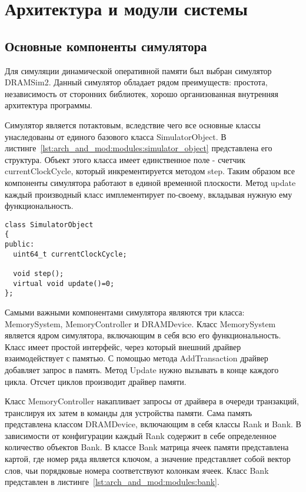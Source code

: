 \section{Архитектура и модули системы} %
\label{sec:arch_and_mod}

\subsection{Основные компоненты симулятора}
\label{sub:arch_and_mod:modules}
Для симуляции динамической оперативной памяти был выбран симулятор DRAMSim2. Данный симулятор обладает рядом преимуществ: простота, независимость от сторонних библиотек, хорошо организованная внутренняя архитектура программы. 

Симулятор является потактовым, вследствие чего все основные классы унаследованы от единого базового класса SimulatorObject. В листинге~\ref{lst:arch_and_mod:modules:simulator_object} представлена его структура. Объект этого класса имеет единственное поле - счетчик currentClockCycle, который инкрементируется методом step. Таким образом все компоненты симулятора работают в единой временной плоскости. Метод update каждый производный класс имплементирует по-своему, вкладывая нужную ему функциональность.  

\begin{lstlisting}[style=cplusplusstyle, caption={Класс SimulatorObject}, label=lst:arch_and_mod:modules:simulator_object]
class SimulatorObject
{
public:
  uint64_t currentClockCycle;

  void step();
  virtual void update()=0;
};
\end{lstlisting}

Самыми важными компонентами симулятора являются три класса: MemorySystem, MemoryController и DRAMDevice. 
Класс MemorySystem является ядром симулятора, включающим в себя всю его функциональность. Класс имеет простой интерфейс, через который внешний драйвер взаимодействует с памятью. С помощью метода AddTransaction драйвер добавляет запрос в память. Метод Update нужно вызывать в конце каждого цикла. Отсчет циклов производит драйвер памяти. 

Класс MemoryController  накапливает запросы от драйвера в очереди транзакций, транслируя их затем в команды для устройства памяти.  
Сама память представлена классом DRAMDevice, включающим в себя классы Rank и Bank. В зависимости от конфигурации каждый Rank содержит в себе определенное количество объектов Bank. В классе Bank матрица ячеек памяти представлена картой, где номер ряда является ключом, а значение представляет собой вектор слов, чьи порядковые номера соответствуют колонкам ячеек. Класс Bank представлен в листинге~\ref{lst:arch_and_mod:modules:bank}.

